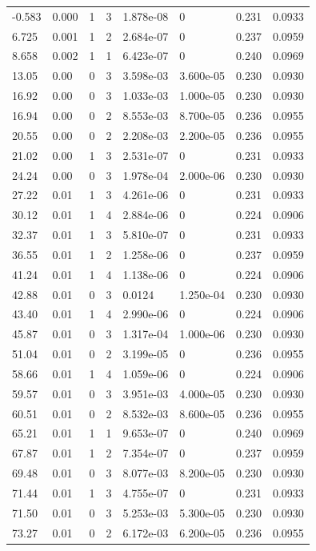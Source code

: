 \documentclass[preview]{standalone}
\begin{document}
{{\begin{tabular}{L{1.2cm}C{1.2cm} C{0.3cm}C{0.5cm} C{1.4cm}C{1.4cm} C{1.4cm}C{1.4cm}}
  -0.583  &  0.000  & 1     &  3 &  1.878e-08  & 0  & 0.231 &  0.0933   \\ 
  6.725  &  0.001  & 1     &  2 &  2.684e-07  & 0  & 0.237 &  0.0959   \\ 
  8.658  &  0.002  & 1     &  1 &  6.423e-07  & 0  & 0.240 &  0.0969   \\ 
  13.05  &  0.00  & 0     &  3 &  3.598e-03  & 3.600e-05  & 0.230 &  0.0930   \\ 
  16.92  &  0.00  & 0     &  3 &  1.033e-03  & 1.000e-05  & 0.230 &  0.0930   \\ 
  16.94  &  0.00  & 0     &  2 &  8.553e-03  & 8.700e-05  & 0.236 &  0.0955   \\ 
  20.55  &  0.00  & 0     &  2 &  2.208e-03  & 2.200e-05  & 0.236 &  0.0955   \\ 
  21.02  &  0.00  & 1     &  3 &  2.531e-07  & 0  & 0.231 &  0.0933   \\ 
  24.24  &  0.00  & 0     &  3 &  1.978e-04  & 2.000e-06  & 0.230 &  0.0930   \\ 
  27.22  &  0.01  & 1     &  3 &  4.261e-06  & 0  & 0.231 &  0.0933   \\ 
  30.12  &  0.01  & 1     &  4 &  2.884e-06  & 0  & 0.224 &  0.0906   \\ 
  32.37  &  0.01  & 1     &  3 &  5.810e-07  & 0  & 0.231 &  0.0933   \\ 
  36.55  &  0.01  & 1     &  2 &  1.258e-06  & 0  & 0.237 &  0.0959   \\ 
  41.24  &  0.01  & 1     &  4 &  1.138e-06  & 0  & 0.224 &  0.0906   \\ 
  42.88  &  0.01  & 0     &  3 &  0.0124  & 1.250e-04  & 0.230 &  0.0930   \\ 
  43.40  &  0.01  & 1     &  4 &  2.990e-06  & 0  & 0.224 &  0.0906   \\ 
  45.87  &  0.01  & 0     &  3 &  1.317e-04  & 1.000e-06  & 0.230 &  0.0930   \\ 
  51.04  &  0.01  & 0     &  2 &  3.199e-05  & 0  & 0.236 &  0.0955   \\ 
  58.66  &  0.01  & 1     &  4 &  1.059e-06  & 0  & 0.224 &  0.0906   \\ 
  59.57  &  0.01  & 0     &  3 &  3.951e-03  & 4.000e-05  & 0.230 &  0.0930   \\ 
  60.51  &  0.01  & 0     &  2 &  8.532e-03  & 8.600e-05  & 0.236 &  0.0955   \\ 
  65.21  &  0.01  & 1     &  1 &  9.653e-07  & 0  & 0.240 &  0.0969   \\ 
  67.87  &  0.01  & 1     &  2 &  7.354e-07  & 0  & 0.237 &  0.0959   \\ 
  69.48  &  0.01  & 0     &  3 &  8.077e-03  & 8.200e-05  & 0.230 &  0.0930   \\ 
  71.44  &  0.01  & 1     &  3 &  4.755e-07  & 0  & 0.231 &  0.0933   \\ 
  71.50  &  0.01  & 0     &  3 &  5.253e-03  & 5.300e-05  & 0.230 &  0.0930   \\ 
  73.27  &  0.01  & 0     &  2 &  6.172e-03  & 6.200e-05  & 0.236 &  0.0955   \\ 
\hline 
\end{tabular} 

}}
\end{document}
